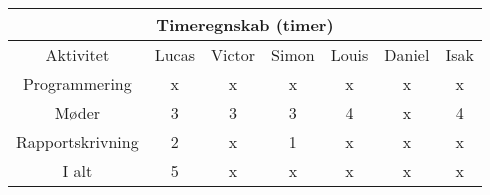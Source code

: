 \centering
\begin{tabular}{ |c|c|c|c|c|c|c|  }
 \hline
 \multicolumn{7}{|c|}{Timeregnskab (timer)} \\
 \hline
 Aktivitet & Lucas & Victor & Simon & Louis & Daniel & Isak\\
 \hline
 
 
 Programmering      & x & x & x & x & x & x \\
 Møder              & 3 & 3 & 3 & 4 & x & 4 \\
 Rapportskrivning   & 2 & x & 1 & x & x & x \\
 I alt              & 5 & x & x & x & x & x \\
 
 
 \hline
\end{tabular}